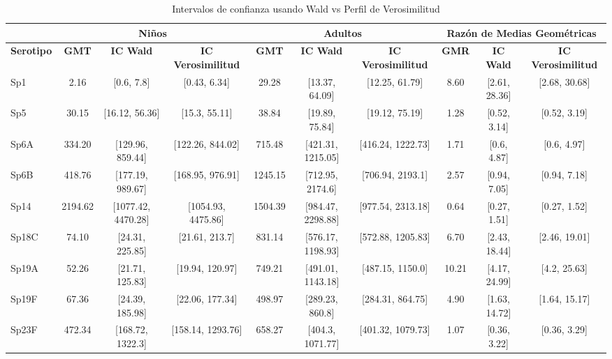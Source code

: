 \vspace{1.5cm}
\begin{table}[htbp]
	\centering
	\caption{Intervalos de confianza usando Wald vs Perfil de Verosimilitud}
	\label{tab:wald_vs_profile}
	
	\renewcommand{\arraystretch}{1.5} 
	
	\begin{adjustbox}{max width=\textwidth}
		\begin{tabular}{|l|c|c|c|c|c|c|c|c|c|}
			\hline
			& \multicolumn{3}{c|}{\textbf{Niños}} & \multicolumn{3}{c|}{\textbf{Adultos}} & \multicolumn{3}{c|}{\textbf{Razón de Medias Geométricas}} \\
			\hline
			\textbf{Serotipo} & \textbf{GMT} & \textbf{IC Wald} & \textbf{IC Verosimilitud} & \textbf{GMT} & \textbf{IC Wald} & \textbf{IC Verosimilitud} & \textbf{GMR} & \textbf{IC Wald} & \textbf{IC Verosimilitud} \\
			\hline
			Sp1   & 2.16   & [0.6, 7.8]       & [0.43, 6.34]     & 29.28   & [13.37, 64.09]   & [12.25, 61.79]   & 8.60  & [2.61, 28.36]  & [2.68, 30.68]  \\ \hline
			Sp5   & 30.15  & [16.12, 56.36]   & [15.3, 55.11]    & 38.84   & [19.89, 75.84]   & [19.12, 75.19]   & 1.28  & [0.52, 3.14]   & [0.52, 3.19]   \\ \hline
			Sp6A  & 334.20 & [129.96, 859.44] & [122.26, 844.02] & 715.48  & [421.31, 1215.05]& [416.24, 1222.73]& 1.71  & [0.6, 4.87]    & [0.6, 4.97]    \\ \hline
			Sp6B  & 418.76 & [177.19, 989.67] & [168.95, 976.91] & 1245.15 & [712.95, 2174.6]  & [706.94, 2193.1] & 2.57  & [0.94, 7.05]   & [0.94, 7.18]   \\ \hline
			Sp14  & 2194.62& [1077.42, 4470.28]& [1054.93, 4475.86]& 1504.39& [984.47, 2298.88] & [977.54, 2313.18]& 0.64  & [0.27, 1.51]   & [0.27, 1.52]   \\ \hline
			Sp18C & 74.10  & [24.31, 225.85]  & [21.61, 213.7]   & 831.14  & [576.17, 1198.93] & [572.88, 1205.83]& 6.70  & [2.43, 18.44]  & [2.46, 19.01]  \\ \hline
			Sp19A & 52.26  & [21.71, 125.83]  & [19.94, 120.97]  & 749.21  & [491.01, 1143.18] & [487.15, 1150.0] & 10.21 & [4.17, 24.99]  & [4.2, 25.63]   \\ \hline
			Sp19F & 67.36  & [24.39, 185.98]  & [22.06, 177.34]  & 498.97  & [289.23, 860.8]   & [284.31, 864.75] & 4.90  & [1.63, 14.72]  & [1.64, 15.17]  \\ \hline
			Sp23F & 472.34 & [168.72, 1322.3] & [158.14, 1293.76]& 658.27  & [404.3, 1071.77]  & [401.32, 1079.73]& 1.07  & [0.36, 3.22]   & [0.36, 3.29]   \\ 
			\hline
		\end{tabular}
	\end{adjustbox}
\end{table}
